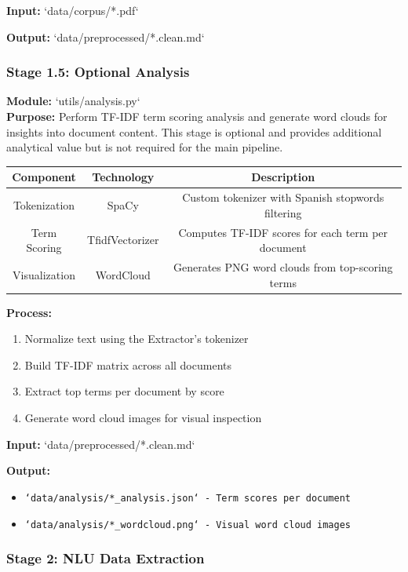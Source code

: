 \documentclass{article}
\begin{document}
\textbf{Input:} `data/corpus/*.pdf`

\textbf{Output:} `data/preprocessed/*.clean.md`

\subsubsection{Stage 1.5: Optional Analysis}

\textbf{Module:} `utils/analysis.py` \\
\textbf{Purpose:} Perform TF-IDF term scoring analysis and generate word clouds for insights into document content. This stage is optional and provides additional analytical value but is not required for the main pipeline.

\begin{center}
\begin{tabular}{ |c|c|c| } 
 \hline
Component & Technology & Description \\
 \hline\hline
 Tokenization & SpaCy & Custom tokenizer with Spanish stopwords filtering \\
 Term Scoring & TfidfVectorizer & Computes TF-IDF scores for each term per document \\
 Visualization & WordCloud & Generates PNG word clouds from top-scoring terms \\
 \hline
\end{tabular}
\end{center}


\textbf{Process:}
\begin{enumerate}
\item Normalize text using the Extractor's tokenizer
\item Build TF-IDF matrix across all documents
\item Extract top terms per document by score
\item Generate word cloud images for visual inspection
\end{enumerate}

\textbf{Input:} `data/preprocessed/*.clean.md`

\textbf{Output:} 
\begin{itemize}
\item \texttt{`data/analysis/*\_analysis.json` - Term scores per document}
\item \texttt{`data/analysis/*\_wordcloud.png` - Visual word cloud images}
\end{itemize}

\subsubsection{Stage 2: NLU Data Extraction}
\end{document}

